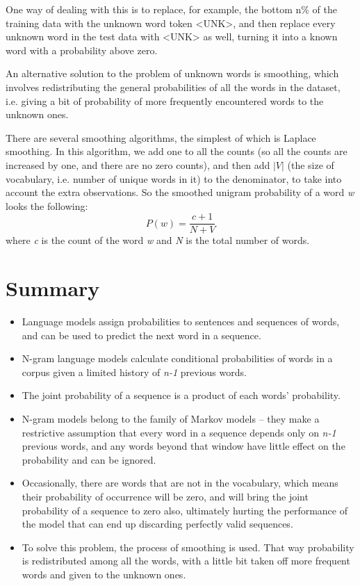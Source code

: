 One way of dealing with this is to replace, for example, the bottom n\% of the training data with the unknown word token <UNK>, and then replace every unknown word in the test data with <UNK> as well, turning it into a known word with a probability above zero.

An alternative solution to the problem of unknown words is smoothing, which involves redistributing the general probabilities of all the words in the dataset, i.e. giving a bit of probability of more frequently encountered words to the unknown ones.

There are several smoothing algorithms, the simplest of which is Laplace smoothing. In this algorithm, we add one to all the counts (so all the counts are increased by one, and there are no zero counts), and then add $|V|$ (the size of vocabulary, i.e. number of unique words in it) to the denominator, to take into account the extra observations. So the smoothed unigram probability of a word \textit{w} looks the following:
\begin{equation}
    P(w)=\frac{c+1}{N+V}
\end{equation}
where \textit{c} is the count of the word \textit{w} and \textit{N} is the total number of words.

\section{Summary}
\label{sec:NgramBackground-Summary}
\begin{itemize}
    \item Language models assign probabilities to sentences and sequences of words, and can be used to predict the next word in a sequence.
    \item N-gram language models calculate conditional probabilities of words in a corpus given a limited history of \textit{n-1} previous words.
    \item The joint probability of a sequence is a product of each words' probability.
    \item N-gram models belong to the family of Markov models -- they make a restrictive assumption that every word in a sequence depends only on \textit{n-1} previous words, and any words beyond that window have little effect on the probability and can be ignored.
    \item Occasionally, there are words that are not in the vocabulary, which means their probability of occurrence will be zero, and will bring the joint probability of a sequence to zero also, ultimately hurting the performance of the model that can end up discarding perfectly valid sequences.
    \item To solve this problem, the process of smoothing is used. That way probability is redistributed among all the words, with a little bit taken off more frequent words and given to the unknown ones.
\end{itemize}